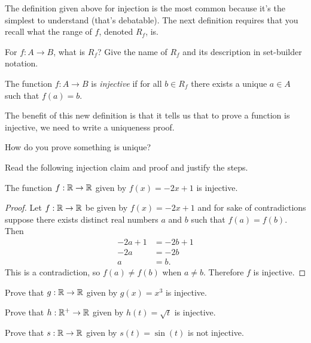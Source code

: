 The definition given above for injection is the most common because it's the simplest to understand (that's debatable).  The next definition requires that you recall what the range of $f$, denoted $R_f$, is.

\begin{question}[resume]
\item For $f: A \to B$, what is $R_f$?  Give the name of $R_f$ and its description in set-builder notation.

\vspace{2in}

\end{question}

\begin{definition}  The function $f: A \to B$ is \textit{injective} if for all $b \in R_f$ there exists a unique $a \in A$ such that $f(a)=b$.
\end{definition}

The benefit of this new definition is that it tells us that to prove a function is injective, we need to write a uniqueness proof.

\begin{question}[resume]
\item How do you prove something is unique?

\vspace{1.5in}

\item Read the following injection claim and proof and justify the steps.
\begin{claim}
The function $f: \mathbb{R} \to \mathbb{R}$ given by $f(x)=-2x+1$ is injective.
\end{claim}
\begin{proof}  Let $f: \mathbb{R} \to \mathbb{R}$ be given by $f(x) = -2x+1$ and for sake of contradictions suppose there exists distinct real numbers $a$ and $b$ such that $f(a)=f(b)$.  Then
	\begin{align*}
	-2a+1 &= -2b+1 \\
	-2a &= -2b \\
	a &= b.
	\end{align*}
	This is a contradiction, so $f(a) \neq f(b)$ when $a \neq b$.  Therefore $f$ is injective.
\end{proof}
\item Prove that $g: \mathbb{R} \to \mathbb{R}$ given by $g(x) = x^3$ is injective.

\newpage
\item Prove that $h: \mathbb{R}^+ \to \mathbb{R}$ given by $h(t) = \sqrt{t}$ is injective.

\vspace{2.5in}
\item Prove that $s: \mathbb{R} \to \mathbb{R}$ given by $s(t) = \sin(t)$ is not injective.

\vspace{2.5in}
\end{question}

